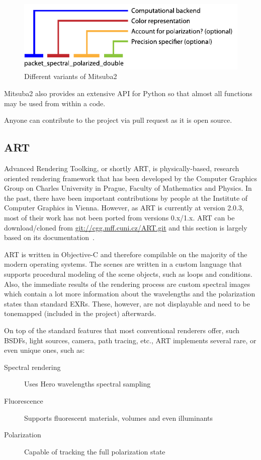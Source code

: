\begin{figure}
	\centering
	\includegraphics[width=0.8\linewidth]{img/mitsuba_variants.pdf}
	\caption{Different variants of Mitsuba2}
	\label{fig:mitsuba_variations}
\end{figure}

Mitsuba2 also provides an extensive API for Python so that almost all functions may be used from within a code. 

Anyone can contribute to the project via pull request as it is open source.

\subsection{ART}

Advanced Rendering Toolking, or shortly ART, is physically-based, research oriented rendering framework that has been developed by the Computer Graphics Group on Charles University in Prague, Faculty of Mathematics and Physics. In the past, there have been important contributions by people at the Institute of Computer Graphics in Vienna. However, as ART is currently at version 2.0.3, most of their work has not been ported from versions 0.x/1.x. ART can be download/cloned from \url{git://cgg.mff.cuni.cz/ART.git} and this section is largely based on its documentation~\cite{artDoc}.

ART is written in Objective-C and therefore compilable on the majority of the modern operating systems. The scenes are written in a custom language that supports procedural modeling of the scene objects, such as loops and conditions. Also, the immediate results of the rendering process are custom spectral images which contain a lot more information about the wavelengths and the polarization states than standard EXRs. These, however, are not displayable and need to be tonemapped (included in the project) afterwards.

On top of the standard features that most conventional renderers offer, such BSDFs, light sources, camera, path tracing, etc., ART implements several rare, or even unique ones, such as:

\begin{description}
	\item[Spectral rendering] Uses Hero wavelengths spectral sampling
	\item[Fluorescence] Supports fluorescent materials, volumes and even illuminants
	\item[Polarization] Capable of tracking the full polarization state
\end{description}

